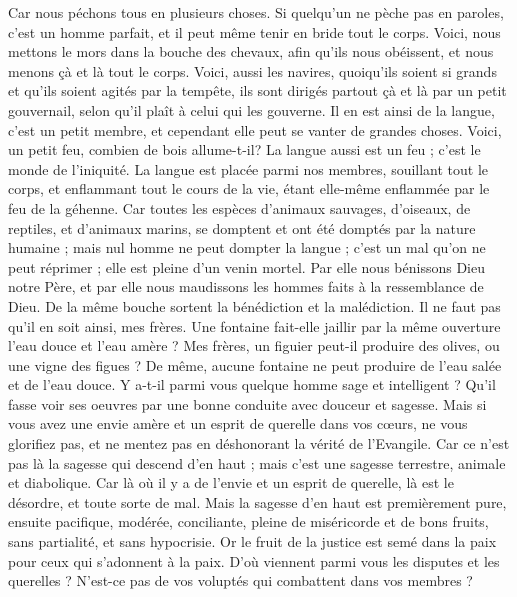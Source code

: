 \begin{multicols}{2}
Car nous péchons tous en plusieurs choses. Si quelqu'un ne pèche pas en paroles, c'est un homme parfait, et il peut même tenir en bride tout le corps.
Voici, nous mettons le mors dans la bouche des chevaux, afin qu'ils nous obéissent, et nous menons çà et là tout le corps.
Voici, aussi les navires, quoiqu'ils soient si grands et qu'ils soient agités par la tempête, ils sont dirigés partout çà et là par un petit gouvernail, selon qu'il plaît à celui qui les gouverne.
Il en est ainsi de la langue, c'est un petit membre, et cependant elle peut se vanter de grandes choses. Voici, un petit feu, combien de bois allume-t-il?
La langue aussi est un feu ; c'est le monde de l'iniquité. La langue est placée parmi nos membres, souillant tout le corps, et enflammant tout le cours de la vie, étant elle-même enflammée par le feu de la géhenne.
Car toutes les espèces d'animaux sauvages, d'oiseaux, de reptiles, et d'animaux marins, se domptent et ont été domptés par la nature humaine ;
mais nul homme ne peut dompter la langue ; c'est un mal qu'on ne peut réprimer ; elle est pleine d'un venin mortel.
Par elle nous bénissons Dieu notre Père, et par elle nous maudissons les hommes faits à la ressemblance de Dieu.
De la même bouche sortent la bénédiction et la malédiction. Il ne faut pas qu'il en soit ainsi, mes frères.
Une fontaine fait-elle jaillir par la même ouverture l'eau douce et l'eau amère ?
Mes frères, un figuier peut-il produire des olives, ou une vigne des figues ? De même, aucune fontaine ne peut produire de l'eau salée et de l'eau douce.
Y a-t-il parmi vous quelque homme sage et intelligent ? Qu'il fasse voir ses oeuvres par une bonne conduite avec douceur et sagesse.
Mais si vous avez une envie amère et un esprit de querelle dans vos cœurs, ne vous glorifiez pas, et ne mentez pas en déshonorant la vérité de l'Evangile.
Car ce n'est pas là la sagesse qui descend d'en haut ; mais c'est une sagesse terrestre, animale et diabolique.
Car là où il y a de l'envie et un esprit de querelle, là est le désordre, et toute sorte de mal.
Mais la sagesse d'en haut est premièrement pure, ensuite pacifique, modérée, conciliante, pleine de miséricorde et de bons fruits, sans partialité, et sans hypocrisie.
Or le fruit de la justice est semé dans la paix pour ceux qui s'adonnent à la paix.
\VerseOne{}D'où viennent parmi vous les disputes et les querelles ? N'est-ce pas de vos voluptés qui combattent dans vos membres ?

\end{multicols}
